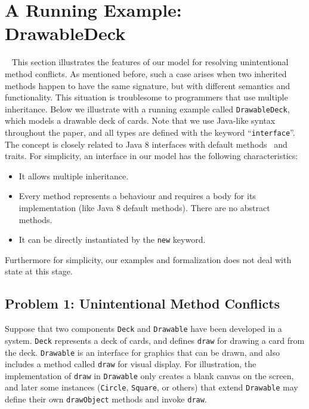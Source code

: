 \section{A Running Example: DrawableDeck}~\label{sec:overview}
This section illustrates the features of our model for
resolving unintentional method conflicts. As mentioned before, such a
case arises when two inherited methods happen to have the same
signature, but with different semantics and functionality. This
situation is troublesome to programmers that use multiple
inheritance. Below we illustrate with a running example called
\lstinline|DrawableDeck|, which models a drawable deck of cards. 
Note that we use Java-like syntax
throughout the paper, and all types are defined with the keyword
``\lstinline|interface|''. The concept is closely related to Java 8
interfaces with default methods~\cite{bono14} and traits. For simplicity, an interface in our model has
the following characteristics:
\begin{itemize}
  \item It allows multiple inheritance.
  \item Every method represents a behaviour and requires a body for its implementation (like Java 8 default methods). There are no abstract methods.
  \item It can be directly instantiated by the \lstinline|new| keyword.
\end{itemize}
Furthermore for simplicity, our examples and formalization does not deal with state at
this stage. %

\subsection{Problem 1: Unintentional Method Conflicts}
Suppose that two components \lstinline|Deck| and \lstinline|Drawable| 
have been developed in a system.  \lstinline|Deck| represents a deck
of cards, and defines \lstinline|draw| for drawing a card from the
deck.  \lstinline|Drawable| is an interface for graphics that
can be drawn, and also includes a method called \lstinline|draw| for
visual display. For illustration, the implementation of
\lstinline|draw| in \lstinline|Drawable| only creates a blank canvas
on the screen, and later some instances (\lstinline|Circle|,
\lstinline|Square|, or others) that extend \lstinline|Drawable| may
define their own \lstinline|drawObject| methods and invoke
\lstinline|draw|.

